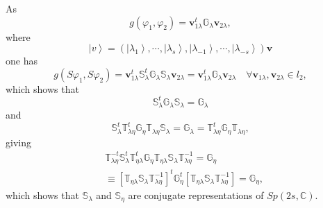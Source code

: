 \documentclass[aps,preprint]{revtex4}%
\begin{document}
As
\begin{equation}
g\left(  \varphi_{1},\varphi_{2}\right)  =\mathbf{v}_{1\lambda}^{t}%
\mathbb{G}_{\lambda}\mathbf{v}_{2\lambda},
\end{equation}
where
\begin{equation}
\left\vert v\right\rangle =\left(  \left\vert \lambda_{1}\right\rangle
,\cdots,\left\vert \lambda_{s}\right\rangle ,\left\vert \lambda_{-1}%
\right\rangle ,\cdots,\left\vert \lambda_{-s}\right\rangle \right)  \mathbf{v}%
\end{equation}
one has%
\begin{equation}
g\left(  S\varphi_{1},S\varphi_{2}\right)  =\mathbf{v}_{1\lambda}%
^{t}\mathbb{S}_{\lambda}^{t}\mathbb{G}_{\lambda}\mathbb{S}_{\lambda}%
\mathbf{v}_{2\lambda}=\mathbf{v}_{1\lambda}^{t}\mathbb{G}_{\lambda}%
\mathbf{v}_{2\lambda}\quad\forall\mathbf{v}_{1\lambda},\mathbf{v}_{2\lambda
}\in l_{2},
\end{equation}
which shows that%
\begin{equation}
\mathbb{S}_{\lambda}^{t}\mathbb{G}_{\lambda}\mathbb{S}_{\lambda}%
=\mathbb{G}_{\lambda}%
\end{equation}
and
\begin{equation}
\mathbb{S}_{\lambda}^{t}\mathbb{T}_{\lambda\eta}^{t}\mathbb{G}_{\eta
}\mathbb{T}_{\lambda\eta}\mathbb{S}_{\lambda}=\mathbb{G}_{\lambda}%
=\mathbb{T}_{\lambda\eta}^{t}\mathbb{G}_{\eta}\mathbb{T}_{\lambda\eta},
\end{equation}
giving
\begin{align}
&  \mathbb{T}_{\lambda\eta}^{-t}\mathbb{S}_{\lambda}^{t}\mathbb{T}%
_{\eta\lambda}^{t}\mathbb{G}_{\eta}\mathbb{T}_{\eta\lambda}\mathbb{S}%
_{\lambda}\mathbb{T}_{\lambda\eta}^{-1}=\mathbb{G}_{\eta}\nonumber\\
&  \equiv\left[  \mathbb{T}_{\eta\lambda}\mathbb{S}_{\lambda}\mathbb{T}%
_{\lambda\eta}^{-1}\right]  ^{t}\mathbb{G}_{\eta}^{t}\left[  \mathbb{T}%
_{\eta\lambda}\mathbb{S}_{\lambda}\mathbb{T}_{\lambda\eta}^{-1}\right]
=\mathbb{G}_{\eta},
\end{align}
which shows that $\mathbb{S}_{\lambda}$ and $\mathbb{S}_{\eta}$ are conjugate
representations of $Sp\left(  2s,\mathbb{C}\right)  $.
\end{document}
